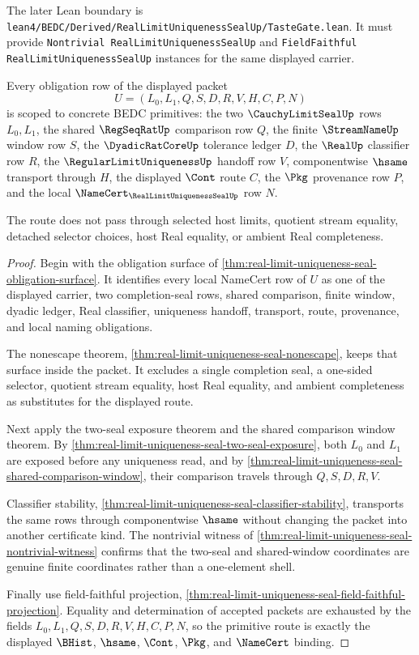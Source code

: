 The later Lean boundary is \texttt{lean4/BEDC/Derived/RealLimitUniquenessSealUp/TasteGate.lean}. It must provide \texttt{Nontrivial RealLimitUniquenessSealUp} and \texttt{FieldFaithful RealLimitUniquenessSealUp} instances for the same displayed carrier.

\begin{theorem}
\label{thm:real-limit-uniqueness-seal-primitive-scope-route}
Every obligation row of the displayed packet
$$
U=(L_0,L_1,Q,S,D,R,V,H,C,P,N)
$$
is scoped to concrete BEDC primitives: the two $\CauchyLimitSealUp$ rows $L_0,L_1$, the shared $\RegSeqRatUp$ comparison row $Q$, the finite $\StreamNameUp$ window row $S$, the $\DyadicRatCoreUp$ tolerance ledger $D$, the $\RealUp$ classifier row $R$, the $\RegularLimitUniquenessUp$ handoff row $V$, componentwise $\hsame$ transport through $H$, the displayed $\Cont$ route $C$, the $\Pkg$ provenance row $P$, and the local $\NameCert_{\RealLimitUniquenessSealUp}$ row $N$.

The route does not pass through selected host limits, quotient stream equality, detached selector choices, host Real equality, or ambient Real completeness.
\end{theorem}
\begin{proof}
Begin with the obligation surface of \autoref{thm:real-limit-uniqueness-seal-obligation-surface}. It identifies every local NameCert row of $U$ as one of the displayed carrier, two completion-seal rows, shared comparison, finite window, dyadic ledger, Real classifier, uniqueness handoff, transport, route, provenance, and local naming obligations.

The nonescape theorem, \autoref{thm:real-limit-uniqueness-seal-nonescape}, keeps that surface inside the packet. It excludes a single completion seal, a one-sided selector, quotient stream equality, host Real equality, and ambient completeness as substitutes for the displayed route.

Next apply the two-seal exposure theorem and the shared comparison window theorem. By \autoref{thm:real-limit-uniqueness-seal-two-seal-exposure}, both $L_0$ and $L_1$ are exposed before any uniqueness read, and by \autoref{thm:real-limit-uniqueness-seal-shared-comparison-window}, their comparison travels through $Q,S,D,R,V$.

Classifier stability, \autoref{thm:real-limit-uniqueness-seal-classifier-stability}, transports the same rows through componentwise $\hsame$ without changing the packet into another certificate kind. The nontrivial witness of \autoref{thm:real-limit-uniqueness-seal-nontrivial-witness} confirms that the two-seal and shared-window coordinates are genuine finite coordinates rather than a one-element shell.

Finally use field-faithful projection, \autoref{thm:real-limit-uniqueness-seal-field-faithful-projection}. Equality and determination of accepted packets are exhausted by the fields $L_0,L_1,Q,S,D,R,V,H,C,P,N$, so the primitive route is exactly the displayed $\BHist$, $\hsame$, $\Cont$, $\Pkg$, and $\NameCert$ binding.
\end{proof}

